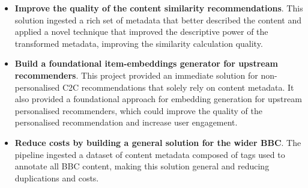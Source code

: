 \begin{itemize}
  \item \textbf{Improve the quality of the content similarity recommendations}.
  This solution ingested a rich set of metadata that better described the content and applied a novel technique
  that improved the descriptive power of the transformed metadata, improving the similarity calculation quality.
  \item \textbf{Build a foundational item-embeddings generator for upstream recommenders}.
  This project provided an immediate solution for non-personalised C2C recommendations that solely rely on content metadata.
  It also provided a foundational approach for embedding generation for upstream personalised recommenders,
  which could improve the quality of the personalised recommendation and increase user engagement.
  \item \textbf{Reduce costs by building a general solution for the wider BBC}.
  The pipeline ingested a dataset of content metadata composed of tags used to annotate all BBC content,
  making this solution general and reducing duplications and costs.
\end{itemize}
